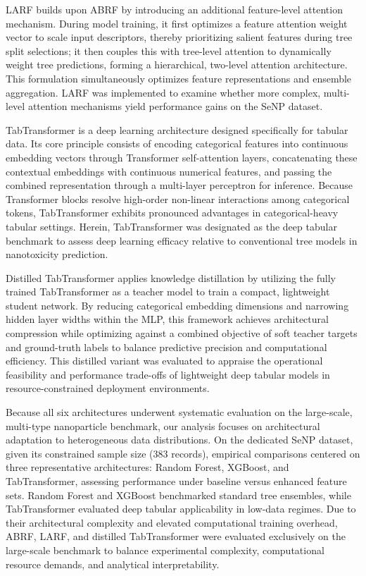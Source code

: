 LARF builds upon ABRF by introducing an additional feature-level attention mechanism. During model training, it first optimizes a feature attention weight vector to scale input descriptors, thereby prioritizing salient features during tree split selections; it then couples this with tree-level attention to dynamically weight tree predictions, forming a hierarchical, two-level attention architecture. This formulation simultaneously optimizes feature representations and ensemble aggregation. LARF was implemented to examine whether more complex, multi-level attention mechanisms yield performance gains on the SeNP dataset.

TabTransformer is a deep learning architecture designed specifically for tabular data. Its core principle consists of encoding categorical features into continuous embedding vectors through Transformer self-attention layers, concatenating these contextual embeddings with continuous numerical features, and passing the combined representation through a multi-layer perceptron for inference. Because Transformer blocks resolve high-order non-linear interactions among categorical tokens, TabTransformer exhibits pronounced advantages in categorical-heavy tabular settings. Herein, TabTransformer was designated as the deep tabular benchmark to assess deep learning efficacy relative to conventional tree models in nanotoxicity prediction.

Distilled TabTransformer applies knowledge distillation by utilizing the fully trained TabTransformer as a teacher model to train a compact, lightweight student network. By reducing categorical embedding dimensions and narrowing hidden layer widths within the MLP, this framework achieves architectural compression while optimizing against a combined objective of soft teacher targets and ground-truth labels to balance predictive precision and computational efficiency. This distilled variant was evaluated to appraise the operational feasibility and performance trade-offs of lightweight deep tabular models in resource-constrained deployment environments.

Because all six architectures underwent systematic evaluation on the large-scale, multi-type nanoparticle benchmark, our analysis focuses on architectural adaptation to heterogeneous data distributions. On the dedicated SeNP dataset, given its constrained sample size (383 records), empirical comparisons centered on three representative architectures: Random Forest, XGBoost, and TabTransformer, assessing performance under baseline versus enhanced feature sets. Random Forest and XGBoost benchmarked standard tree ensembles, while TabTransformer evaluated deep tabular applicability in low-data regimes. Due to their architectural complexity and elevated computational training overhead, ABRF, LARF, and distilled TabTransformer were evaluated exclusively on the large-scale benchmark to balance experimental complexity, computational resource demands, and analytical interpretability.

